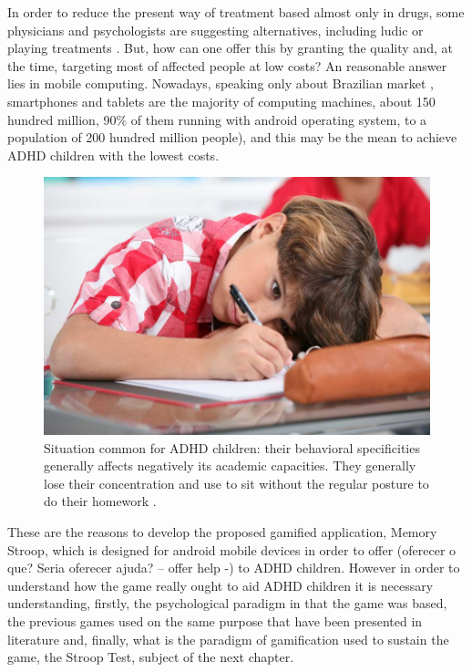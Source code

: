 In order to reduce the present way of treatment based almost only in drugs, some physicians and psychologists are suggesting alternatives, including ludic or playing treatments \citep{Psychoanalytic, brainGames}. But, how can one offer this by granting the quality and, at the time, targeting most of affected people at low costs? An reasonable answer lies in mobile computing. Nowadays, speaking only about Brazilian market \citep{idcTablets}, smartphones and tablets are the majority of computing machines, about 150 hundred million, 90\% of them running with android operating system, to a population of 200 hundred million people\citep{idcTablets}), and this may be the mean to achieve ADHD children with the lowest costs. 





\begin{figure}[htp]

	\begin{center}

		\includegraphics[scale=0.35]{chapters/adhd/img/adhd_child.jpeg}

		\caption{Situation common for ADHD children: their behavioral specificities generally affects negatively its academic capacities. They generally lose their concentration and use to sit without the regular posture to do their homework \citep{child_example}.}

		\label{child}

	\end{center}

\end{figure}



These are the reasons to develop the proposed gamified application, Memory Stroop, which is designed for android mobile devices in order to offer (oferecer o que? Seria oferecer ajuda? – offer help -) to ADHD children. However in order to understand how the game really ought to aid ADHD children it is necessary understanding, firstly, the psychological paradigm in that the game was based, the previous games used on the same purpose that have been presented in literature and, finally, what is the paradigm of gamification used to sustain the game, the Stroop Test, subject of the next chapter. 





